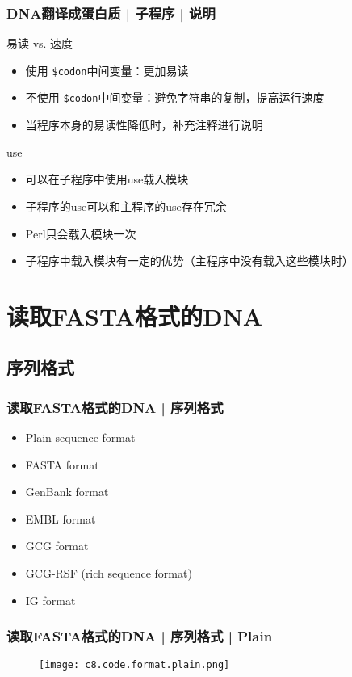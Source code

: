 \begin{frame}[fragile]
  \frametitle{DNA翻译成蛋白质 | 子程序 | \alert{说明}}
  \begin{block}{易读 vs. 速度}
    \begin{itemize}
      \item 使用 \verb|$codon|中间变量：更加易读
      \item 不使用 \verb|$codon|中间变量：避免字符串的复制，提高运行速度
      \item 当程序本身的易读性降低时，补充注释进行说明
    \end{itemize}
  \end{block}
  \pause
  \begin{block}{use}
    \begin{itemize}
      \item 可以在子程序中使用use载入模块
      \item 子程序的use可以和主程序的use存在冗余
      \item Perl只会载入模块一次
      \item 子程序中载入模块有一定的优势（主程序中没有载入这些模块时）
    \end{itemize}
  \end{block}
\end{frame}

\section{读取FASTA格式的DNA}
\subsection{序列格式}
\begin{frame}
  \frametitle{读取FASTA格式的DNA | 序列格式}
  \begin{itemize}
    \item Plain sequence format
    \item FASTA format
    \item GenBank format
    \item EMBL format
    \item GCG format
    \item GCG-RSF (rich sequence format)
    \item IG format
  \end{itemize}
\end{frame}

\begin{frame}
  \frametitle{读取FASTA格式的DNA | 序列格式 | \alert{Plain}}
  \begin{figure}
    \centering
    \texttt{[image: c8.code.format.plain.png]}
  \end{figure}
\end{frame}

